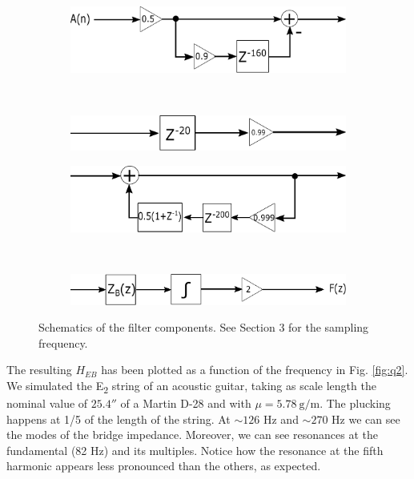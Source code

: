 \documentclass[a4paper]{article}
\begin{document}
\begin{figure}[h]
	\centering
	\begin{subfigure}{0.47\linewidth}
		\centering
		\includegraphics[width=0.9\linewidth]{H_E.pdf}
		\caption{}
		\label{fig:he}
	\end{subfigure}
	~
	\begin{subfigure}{0.47\linewidth}
		\centering
		\includegraphics[width=0.9\linewidth]{H_E1R1.pdf}
		\caption{}
		\label{fig:he1r1}
	\end{subfigure}

	\begin{subfigure}{0.47\linewidth}
		\centering
		\includegraphics[width=0.9\linewidth]{S.pdf}
		\caption{}
		\label{fig:s}
	\end{subfigure}
	~
	\begin{subfigure}[b]{0.47\linewidth}
		\centering
		\includegraphics[width=0.9\linewidth]{H_B.pdf}
		\caption{}
		\label{fig:hb}
	\end{subfigure}
	\caption{Schematics of the filter components. See Section 3 for the sampling frequency.}
\end{figure}

The resulting $H_{EB}$ has been plotted as a function of the frequency in Fig. \ref{fig:q2}. We simulated the E\textsubscript{2} string of an acoustic guitar, taking as scale length the nominal value of $25.4''$ of a Martin D-28 and with $\mu = \SI{5.78}{\gram\per\meter}$. The plucking happens at 1/5 of the length of the string. At $\sim126$ Hz and $\sim270$ Hz we can see the modes of the bridge impedance. Moreover, we can see resonances at the fundamental (82 Hz) and its multiples. Notice how the resonance at the fifth harmonic appears less pronounced than the others, as expected.
\end{document}

